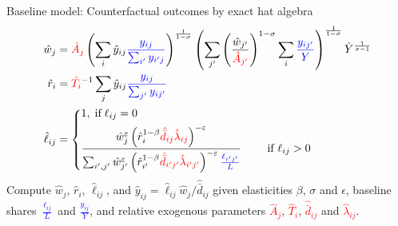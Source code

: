 \documentclass[11pt,notes=hide,aspectratio=169]{beamer}
\begin{document}
\begin{frame}{Baseline model: Counterfactual outcomes by exact hat algebra}
\vspace{-1cm}
\begin{align}
\hat{w}_{j}
&=
\textcolor{red}{\hat{A}_j}
\left(\sum_{i} \hat{y}_{ij}\textcolor{blue}{\frac{y_{ij}}{\sum_{i'} y_{i'j}}}\right)^{\frac{1}{1-\sigma}}
\left(\sum_{j'} \left(\frac{\hat{w}_{j'}}{\textcolor{red}{\hat{A}_{j'}}}\right)^{1-\sigma} \sum_{i} \textcolor{blue}{\frac{y_{ij'}}{Y}} \right)^{\frac{1}{1-\sigma}}
\hat{Y}^{\frac{1}{\sigma-1}}\\
\hat{r}_{i}
&=
\textcolor{red}{\hat{T}_{i}}^{-1} \sum_{j}\hat{y}_{ij}\textcolor{blue}{\frac{y_{ij}}{\sum_{j'}y_{ij'}}}
\\
\hat{\ell}_{ij} 
&=
\left\{
\begin{aligned}
&1, \; \text{if} \; \ell_{ij}=0 \\
&\frac{\hat{w}_{j}^{\varepsilon}\left(\hat{r}_{i}^{1-\beta} \textcolor{red}{\hat{\bar{d}}_{ij}\hat{ \lambda}_{ij}} \right)^{-\varepsilon}}{\sum_{i',j'} \hat{w}_{j'}^{\varepsilon}\left(\hat{r}_{i'}^{1-\beta} \textcolor{red}{\hat{\bar{d}}_{i'j'}\hat{ \lambda}_{i'j'}} \right)^{-\varepsilon} \textcolor{blue}{\frac{\ell_{i'j'}}{L}}} \qquad \text{ if } \ell_{ij} > 0 \\
\end{aligned}
\right.
\end{align}
Compute $\hat{w}_j$, $\hat{r}_i$, $\hat{\ell}_{ij}$, and 
$\hat{y}_{ij} = \hat{\ell}_{ij} \hat{w}_{j} / \hat{\bar{d}}_{ij}$
given 
elasticities $\beta$, $\sigma$ and $\epsilon$, 
baseline shares \textcolor{blue}{$\frac{\ell_{ij}}{L}$}
and \textcolor{blue}{$\frac{y_{ij}}{Y}$},
and
relative exogenous parameters
\textcolor{red}{$\hat{A}_{j}$}, \textcolor{red}{$\hat{T}_{i}$}, \textcolor{red}{$\hat{\bar{d}}_{ij}$} and \textcolor{red}{$\hat{ \lambda}_{ij}$}.
\end{frame}
\end{document}
